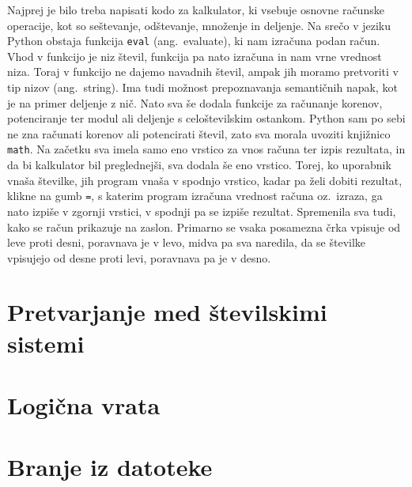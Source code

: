 \documentclass[12pt]{article}
\begin{document}
	Najprej je bilo treba napisati kodo za kalkulator, ki vsebuje osnovne računske operacije, kot so
	seštevanje, odštevanje, množenje in deljenje. Na srečo v jeziku Python obstaja funkcija \texttt{eval} (ang.~evaluate),
	ki nam izračuna podan račun. Vhod v funkcijo je niz števil, funkcija pa nato izračuna in nam vrne vrednost niza. 
	Toraj v funkcijo ne dajemo navadnih števil, ampak jih moramo pretvoriti v tip nizov (ang.~string).
	Ima tudi možnost prepoznavanja semantičnih napak, kot je na primer deljenje z nič.\cite{error} Nato sva še dodala funkcije za
	računanje korenov, potenciranje ter modul ali deljenje s celoštevilskim ostankom. Python sam po sebi ne zna
	računati korenov ali potencirati števil, zato sva morala uvoziti knjižnico \texttt{math}. Na začetku sva imela samo eno
	vrstico za vnos računa ter izpis rezultata, in da bi kalkulator bil preglednejši, sva dodala še eno vrstico.
	Torej, ko uporabnik vnaša številke, jih program vnaša v spodnjo vrstico, kadar pa želi dobiti rezultat, klikne
	na gumb \texttt{=}, s katerim program izračuna vrednost računa oz.~izraza, ga nato izpiše v zgornji vrstici, v spodnji pa
	se izpiše rezultat. Spremenila sva tudi, kako se račun prikazuje na zaslon. Primarno se vsaka posamezna črka vpisuje
	od leve proti desni, poravnava je v levo, midva pa sva naredila, da se številke vpisujejo od desne proti levi,\cite{rtol}
	poravnava pa je v desno.
	
	
	\section{Pretvarjanje med številskimi sistemi}
	
	\section{Logična vrata}
	
	\section{Branje iz datoteke}
	
\end{document}
